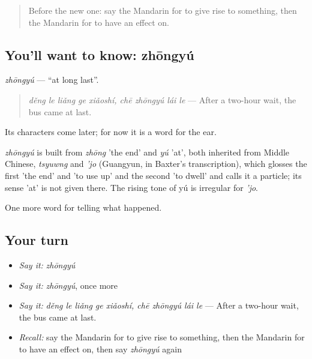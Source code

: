 \label{lesson:ZH-C294-zhongyu}



\begin{quote}
Before the new one: say the Mandarin for to give rise to something, then the Mandarin for to have an effect on.
\end{quote}

\subsection*{You'll want to know: zhōngyú}
\emph{zhōngyú} — \textquotedblleft{}at long last\textquotedblright{}.

\begin{quote}
\emph{děng le liǎng ge xiǎoshí, chē zhōngyú lái le} — After a two-hour wait, the bus came at last.
\end{quote}

Its characters come later; for now it is a word for the ear.

\begin{cousinweb}
\emph{zhōngyú} is built from \emph{zhōng} 'the end' and \emph{yú} 'at', both inherited from Middle Chinese, \emph{tsyuwng} and \emph{'jo} (Guangyun, in Baxter's transcription), which glosses the first 'the end' and 'to use up' and the second 'to dwell' and calls it a particle; its sense 'at' is not given there. The rising tone of yú is irregular for \emph{'jo}.
\end{cousinweb}

\begin{grammarlens}[title={What you've built}]
One more word for telling what happened.
\end{grammarlens}

\subsection*{Your turn}
\begin{itemize}
\raggedright
  \item \emph{Say it:} \emph{zhōngyú}
  \item \emph{Say it:} \emph{zhōngyú}, once more
  \item \emph{Say it:} \emph{děng le liǎng ge xiǎoshí, chē zhōngyú lái le} — After a two-hour wait, the bus came at last.
  \item \emph{Recall:} say the Mandarin for to give rise to something, then the Mandarin for to have an effect on, then say \emph{zhōngyú} again
\end{itemize}

